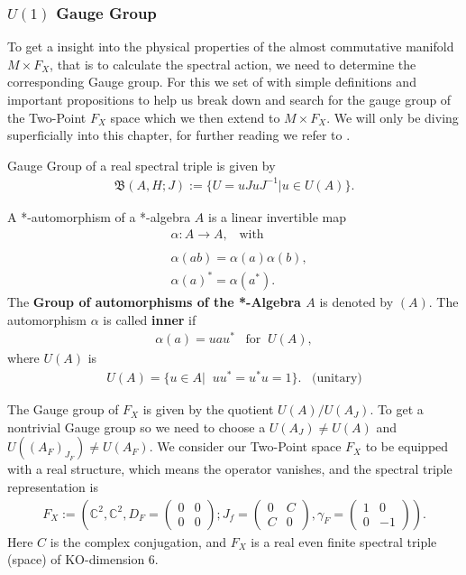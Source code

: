 \subsubsection{$U(1)$ Gauge Group}
To get a insight into the physical properties of the almost commutative
manifold $M\times F_X$, that is to calculate the spectral action, we need to
determine the corresponding Gauge group.
For this we set of with simple definitions and important propositions to
help us break down and search for the gauge group of the Two-Point $F_X$
space which we then extend to $M\times F_X$. We will only be diving
superficially into this chapter, for further reading we refer to
\cite{ncgwalter}.
\begin{mydefinition}
Gauge Group of a real spectral triple is given by
\begin{align}
    \mathfrak{B}(A, H; J) := \{ U = uJuJ^{-1} | u\in U(A)\}.
\end{align}
\end{mydefinition}
\begin{mydefinition}
    A *-automorphism of a *-algebra $A$ is a linear invertible
    map
    \begin{align}
        &\alpha:A \rightarrow A,\;\;\; \text{with}\\
        \nonumber\\
        &\alpha(ab) = \alpha(a)\alpha(b),\\
        &\alpha(a)^* = \alpha(a^*).
    \end{align}
    The \textbf{Group of automorphisms of the *-Algebra $A$} is denoted by
    $(A)$.\newline
    The automorphism $\alpha$ is called \textbf{inner} if
    \begin{align}
        \alpha(a) = u a u^* \;\;\; \text{for} \;\; U(A),
    \end{align}
    where $U(A)$ is
    \begin{align}
        U(A) = \{ u\in A|\;\; uu^* = u^*u=1\}. \;\;\;
        \text{(unitary)}
    \end{align}
\end{mydefinition}
The Gauge group of $F_X$ is given by the quotient $U(A)/U(A_J)$.
To get a nontrivial Gauge group so we need to choose a $U(A_J) \neq
U(A)$ and $U((A_F)_{J_F}) \neq U(A_F)$.
We consider our Two-Point space $F_X$ to be equipped with a real structure,
which means the operator vanishes, and the spectral triple representation is
\begin{align}
    F_X := \left(\mathbb{C}^2,\mathbb{C}^2, D_F =\begin{pmatrix}
        0&0\\0&0\end{pmatrix}; J_f =\begin{pmatrix}
    0&C\\C&0\end{pmatrix},
            \gamma_F = \begin{pmatrix}1&0\\0&-1\end{pmatrix}\right).
\end{align}
Here $C$ is the complex conjugation, and $F_X$ is a real even finite
spectral triple (space) of KO-dimension 6.

